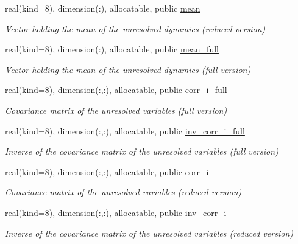 \begin{DoxyCompactItemize}
\item 
real(kind=8), dimension(\+:), allocatable, public \hyperlink{namespacecorrmod_a1f1f0cbe5283ace955c2d27c4b34f2c0}{mean}
\begin{DoxyCompactList}\small\item\em Vector holding the mean of the unresolved dynamics (reduced version) \end{DoxyCompactList}\item 
real(kind=8), dimension(\+:), allocatable, public \hyperlink{namespacecorrmod_a9c59d06165027aa6b1751e219726564a}{mean\+\_\+full}
\begin{DoxyCompactList}\small\item\em Vector holding the mean of the unresolved dynamics (full version) \end{DoxyCompactList}\item 
real(kind=8), dimension(\+:,\+:), allocatable, public \hyperlink{namespacecorrmod_a978b78f1d6906afe06e63768535b44f7}{corr\+\_\+i\+\_\+full}
\begin{DoxyCompactList}\small\item\em Covariance matrix of the unresolved variables (full version) \end{DoxyCompactList}\item 
real(kind=8), dimension(\+:,\+:), allocatable, public \hyperlink{namespacecorrmod_af2ab9712d246a94ae1a801a011aee3d8}{inv\+\_\+corr\+\_\+i\+\_\+full}
\begin{DoxyCompactList}\small\item\em Inverse of the covariance matrix of the unresolved variables (full version) \end{DoxyCompactList}\item 
real(kind=8), dimension(\+:,\+:), allocatable, public \hyperlink{namespacecorrmod_a859a67113b5271db0df70e60cbf0687b}{corr\+\_\+i}
\begin{DoxyCompactList}\small\item\em Covariance matrix of the unresolved variables (reduced version) \end{DoxyCompactList}\item 
real(kind=8), dimension(\+:,\+:), allocatable, public \hyperlink{namespacecorrmod_a5a938587078064124588605255e93a19}{inv\+\_\+corr\+\_\+i}
\begin{DoxyCompactList}\small\item\em Inverse of the covariance matrix of the unresolved variables (reduced version) \end{DoxyCompactList}\item 

\end{DoxyCompactItemize}

